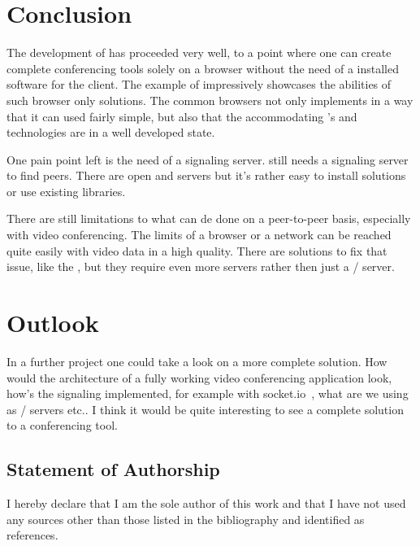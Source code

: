 \clearpage
\chapter{Conclusion}

The development of  has proceeded very well, to a point where one can create complete conferencing tools solely on a browser without the need of a installed software for the client. The example of  impressively showcases the abilities of such browser only solutions. The common browsers not only implements  in a way that it can used fairly simple, but also that the accommodating 's and technologies are in a well developed state.

One pain point left is the need of a signaling server.  still needs a signaling server to find peers. There are open  and  servers but it's rather easy to install  solutions or use existing libraries.

There are still limitations to what can de done on a peer-to-peer basis, especially with video conferencing. The limits of a browser or a network can be reached quite easily with video data in a high quality. There are solutions to fix that issue, like the , but they require even more servers rather then just a / server.

\chapter{Outlook}
In a further project one could take a look on a more complete solution. How would the architecture of a fully working video conferencing application look, how's the signaling implemented, for example with socket.io~\autocite{socketio}, what are we using as / servers etc.. I think it would be quite interesting to see a complete solution to a conferencing tool.

\section{Statement of Authorship}
I hereby declare that I am the sole author of this work and that I have not used any sources other than those listed in the bibliography and identified as references.